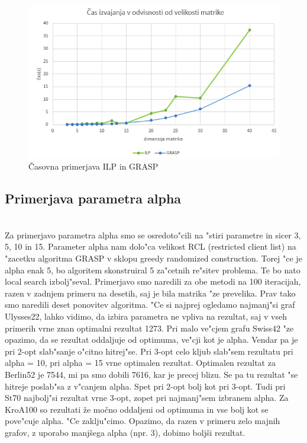 \documentclass[12pt,a4paper]{amsart}
\theoremstyle{definition} %
\theoremstyle{plain} %
\begin{document}
\begin{figure}[H]
\caption{Časovna primerjava ILP in GRASP}
\centering
\includegraphics[scale =0.8]{casilp}
\end{figure}


\subsection{Primerjava parametra alpha} ~\\
Za primerjavo parametra alpha smo se osredoto"cili na "stiri parametre in sicer 3, 5, 10 in 15. Parameter alpha nam dolo"ca velikost RCL (restricted client list) na "zacetku algoritma GRASP v sklopu greedy randomized construction. Torej "ce je alpha enak 5, bo algoritem skonstruiral 5 za"cetnih re"sitev problema. Te bo nato local search izbolj"seval. Primerjavo smo naredili za obe metodi na 100 iteracijah, razen v zadnjem primeru na desetih, saj je bila matrika "ze prevelika. Prav tako smo naredili deset ponovitev algoritma.
"Ce si najprej ogledamo najmanj"si graf Ulysses22, lahko vidimo, da izbira parametra ne vpliva na rezultat, saj v vseh primerih vrne  znan optimalni rezultat 1273. Pri malo ve"cjem grafu Swiss42 "ze opazimo, da se rezultat oddaljuje od optimuma, ve"cji kot je alpha. Vendar pa je pri 2-opt slab"sanje o"citno hitrej"se. Pri 3-opt celo kljub slab"sem rezultatu pri alpha = 10, pri alpha = 15 vrne optimalen rezultat. Optimalen rezultat za Berlin52 je 7544, mi pa smo dobili 7616, kar je precej blizu. Se pa tu rezultat "se hitreje poslab"sa z v"canjem alpha. Spet pri 2-opt bolj kot pri 3-opt. Tudi pri St70 najbolj"si rezultat vrne 3-opt, zopet pri najmanj"sem izbranem alpha. 
Za KroA100 so rezultati že močno oddaljeni od optimuma in vse bolj kot se pove"cuje alpha. 
"Ce zaklju"cimo. Opazimo, da razen v primeru zelo majnih grafov, z uporabo manjšega alpha (npr. 3), dobimo boljši rezultat. 
\end{document}
